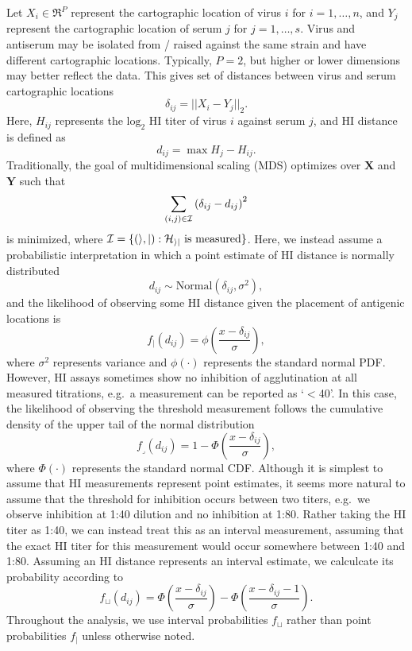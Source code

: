 \documentclass[11pt,oneside,letterpaper]{article}
\newcommand{\point}{f_{\scriptscriptstyle \vert}}
\newcommand{\threshold}{f_{\textstyle \lrcorner}}
\newcommand{\interval}{f_{\sqcup}}
\begin{document}
Let $X_i \in \Re^{P}$ represent the cartographic location of virus $i$ for $i = 1,\ldots, n$, and $Y_j$ represent the cartographic location of serum $j$ for $j = 1,\ldots, s$.
Virus and antiserum may be isolated from / raised against the same strain and have different cartographic locations.
Typically, $P = 2$, but higher or lower dimensions may better reflect the data.  
This gives set of distances between virus and serum cartographic locations 
\begin{equation}
	\delta_{ij} =  || X_i - Y_j ||_2.
\end{equation}
Here, $H_{ij}$ represents the $\mathrm{log}_2$ HI titer of virus $i$ against serum $j$, and HI distance is defined as
\begin{equation}
	d_{ij} =  \max{ H_j } - H_{ij}.
\end{equation}
Traditionally, the goal of multidimensional scaling (MDS) optimizes over $\mathbf{X}$ and $\mathbf{Y}$ such that
\begin{equation}
	\sum_{(i,j) \in \cal I} 
	\left(
		\delta_{ij} - d_{ij}
	\right)^2
\end{equation}
is minimized, where $\cal I = \{ (i,j) : H_{ij} \mbox{ is measured} \}$. 
Here, we instead assume a probabilistic interpretation in which a point estimate of HI distance is normally distributed 
\begin{equation} 
	d_{ij} \sim \mbox{Normal}( \delta_{ij}, \sigma^2 ),
\end{equation}
and the likelihood of observing some HI distance given the placement of antigenic locations is 
\begin{equation} 
	\point(d_{ij}) = \phi \left( \frac{x-\delta_{ij}}{\sigma} \right),
\end{equation}
where $\sigma^2$ represents variance and $\phi(\cdot)$ represents the standard normal PDF.
However, HI assays sometimes show no inhibition of agglutination at all measured titrations, e.g.\ a measurement can be reported as `$<$40'.
In this case, the likelihood of observing the threshold measurement follows the cumulative density of the upper tail of the normal distribution
\begin{equation} 
	\threshold(d_{ij}) = 1 - \Phi \left( \frac{x-\delta_{ij}}{\sigma} \right),
\end{equation}
where $\Phi(\cdot)$ represents the standard normal CDF.
Although it is simplest to assume that HI measurements represent point estimates, it seems more natural to assume that the threshold for inhibition occurs between two titers, e.g.\ we observe inhibition at 1:40 dilution and no inhibition at 1:80.
Rather taking the HI titer as 1:40, we can instead treat this as an interval measurement, assuming that the exact HI titer for this measurement would occur somewhere between 1:40 and 1:80.
Assuming an HI distance represents an interval estimate, we calculcate its probability according to
\begin{equation} 
	\interval(d_{ij}) = \Phi \left( \frac{x-\delta_{ij}}{\sigma} \right) - \Phi \left( \frac{x-\delta_{ij}-1}{\sigma} \right).
\end{equation}
Throughout the analysis, we use interval probabilities $\interval$ rather than point probabilities $\point$ unless otherwise noted.
\end{document}
